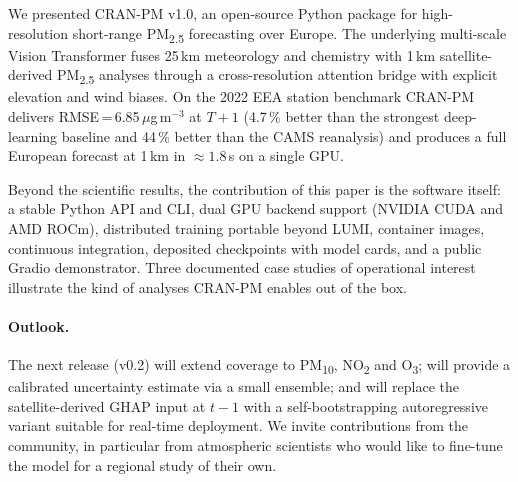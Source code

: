 
We presented CRAN-PM v1.0, an open-source Python package for
high-resolution short-range PM\textsubscript{2.5} forecasting over
Europe. The underlying multi-scale Vision Transformer fuses 25\,km
meteorology and chemistry with 1\,km satellite-derived
PM\textsubscript{2.5} analyses through a cross-resolution attention
bridge with explicit elevation and wind biases. On the 2022 EEA
station benchmark CRAN-PM delivers RMSE\,=\,6.85\,$\mu$g\,m$^{-3}$
at $T+1$ (4.7\,\% better than the strongest deep-learning baseline
and 44\,\% better than the CAMS reanalysis) and produces a full
European forecast at 1\,km in $\approx 1.8$\,s on a single GPU.

Beyond the scientific results, the contribution of this paper is
the software itself: a stable Python API and CLI, dual GPU backend
support (NVIDIA CUDA and AMD ROCm), distributed training portable
beyond LUMI, container images, continuous integration, deposited
checkpoints with model cards, and a public Gradio demonstrator.
Three documented case studies of operational interest illustrate
the kind of analyses CRAN-PM enables out of the box.

\paragraph{Outlook.}
The next release (v0.2) will extend coverage to PM\textsubscript{10},
NO\textsubscript{2} and O\textsubscript{3}; will provide a
calibrated uncertainty estimate via a small ensemble; and will
replace the satellite-derived GHAP input at $t-1$ with a
self-bootstrapping autoregressive variant suitable for real-time
deployment. We invite contributions from the community, in
particular from atmospheric scientists who would like to fine-tune
the model for a regional study of their own.
